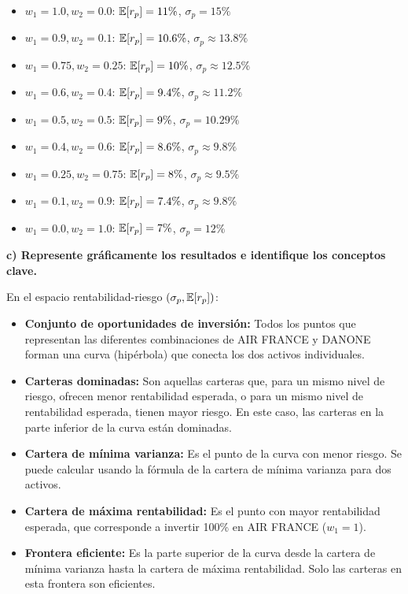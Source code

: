 \begin{ejemplo}
\begin{itemize}
\item $w_1 = 1.0, w_2 = 0.0$: $\mathbb{E}[r_p] = 11\%$, $\sigma_p = 15\%$
\item $w_1 = 0.9, w_2 = 0.1$: $\mathbb{E}[r_p] = 10.6\%$, $\sigma_p \approx 13.8\%$
\item $w_1 = 0.75, w_2 = 0.25$: $\mathbb{E}[r_p] = 10\%$, $\sigma_p \approx 12.5\%$
\item $w_1 = 0.6, w_2 = 0.4$: $\mathbb{E}[r_p] = 9.4\%$, $\sigma_p \approx 11.2\%$
\item $w_1 = 0.5, w_2 = 0.5$: $\mathbb{E}[r_p] = 9\%$, $\sigma_p = 10.29\%$
\item $w_1 = 0.4, w_2 = 0.6$: $\mathbb{E}[r_p] = 8.6\%$, $\sigma_p \approx 9.8\%$
\item $w_1 = 0.25, w_2 = 0.75$: $\mathbb{E}[r_p] = 8\%$, $\sigma_p \approx 9.5\%$
\item $w_1 = 0.1, w_2 = 0.9$: $\mathbb{E}[r_p] = 7.4\%$, $\sigma_p \approx 9.8\%$
\item $w_1 = 0.0, w_2 = 1.0$: $\mathbb{E}[r_p] = 7\%$, $\sigma_p = 12\%$
\end{itemize}

\textbf{c) Represente gráficamente los resultados e identifique los conceptos clave.}

En el espacio rentabilidad-riesgo $(\sigma_p, \mathbb{E}[r_p])$:

\begin{itemize}
\item \textbf{Conjunto de oportunidades de inversión:} Todos los puntos que representan las diferentes combinaciones de AIR FRANCE y DANONE forman una curva (hipérbola) que conecta los dos activos individuales.

\item \textbf{Carteras dominadas:} Son aquellas carteras que, para un mismo nivel de riesgo, ofrecen menor rentabilidad esperada, o para un mismo nivel de rentabilidad esperada, tienen mayor riesgo. En este caso, las carteras en la parte inferior de la curva están dominadas.

\item \textbf{Cartera de mínima varianza:} Es el punto de la curva con menor riesgo. Se puede calcular usando la fórmula de la cartera de mínima varianza para dos activos.

\item \textbf{Cartera de máxima rentabilidad:} Es el punto con mayor rentabilidad esperada, que corresponde a invertir 100\% en AIR FRANCE ($w_1 = 1$).

\item \textbf{Frontera eficiente:} Es la parte superior de la curva desde la cartera de mínima varianza hasta la cartera de máxima rentabilidad. Solo las carteras en esta frontera son eficientes.
\end{itemize}


\end{ejemplo}
